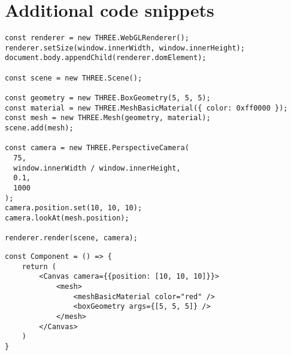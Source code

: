 \chapter{Additional code snippets} 

\begin{lstlisting}[caption={~Creating and displaying a 3D red cube with Three.js},label={lst:threejs},captionpos=b,float,abovecaptionskip=\medskipamount,belowcaptionskip=\medskipamount]
const renderer = new THREE.WebGLRenderer();
renderer.setSize(window.innerWidth, window.innerHeight);
document.body.appendChild(renderer.domElement);

const scene = new THREE.Scene();

const geometry = new THREE.BoxGeometry(5, 5, 5);
const material = new THREE.MeshBasicMaterial({ color: 0xff0000 });
const mesh = new THREE.Mesh(geometry, material);
scene.add(mesh);

const camera = new THREE.PerspectiveCamera(
  75,
  window.innerWidth / window.innerHeight,
  0.1,
  1000
);
camera.position.set(10, 10, 10);
camera.lookAt(mesh.position);

renderer.render(scene, camera);

\end{lstlisting}


\begin{lstlisting}[caption={~Creating a 3D red cube as a React component with R3F},label={lst:r3f},captionpos=b,float,abovecaptionskip=\medskipamount,belowcaptionskip=\medskipamount]
const Component = () => {
    return (
        <Canvas camera={{position: [10, 10, 10]}}>
            <mesh>
                <meshBasicMaterial color="red" />
                <boxGeometry args={[5, 5, 5]} />
            </mesh>
        </Canvas>
    )
}
\end{lstlisting}
